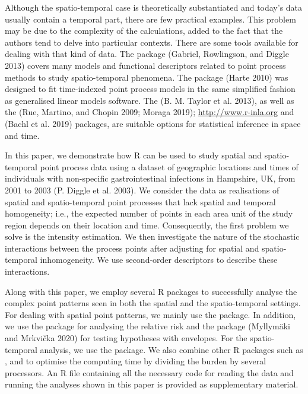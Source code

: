Although the spatio-temporal case is theoretically substantiated and today's data usually contain a temporal part, there are few practical examples. This problem may be due to the complexity of the calculations, added to the fact that the authors tend to delve into particular contexts. There are some tools available for dealing with that kind of data. The  package (Gabriel, Rowlingson, and Diggle 2013) covers many models and functional descriptors related to point process methods to study spatio-temporal phenomena. The  package (Harte 2010) was designed to fit time-indexed point process models in the same simplified fashion as generalised linear models software. The  (B. M. Taylor et al. 2013), as well as the  (Rue, Martino, and Chopin 2009; Moraga 2019); \url{http://www.r-inla.org} and  (Bachl et al. 2019) packages, are suitable options for statistical inference in space and time.

In this paper, we demonstrate how R can be used to study spatial and spatio-temporal point process data using a dataset of geographic locations and times of individuals with non-specific gastrointestinal infections in Hampshire, UK, from 2001 to 2003 (P. Diggle et al. 2003). We consider the data as realisations of spatial and spatio-temporal point processes that lack spatial and temporal homogeneity; i.e., the expected number of points in each area unit of the study region depends on their location and time. Consequently, the first problem we solve is the intensity estimation. We then investigate the nature of the stochastic interactions between the process points after adjusting for spatial and spatio-temporal inhomogeneity. We use second-order descriptors to describe these interactions.

Along with this paper, we employ several R packages to successfully analyse the complex point patterns seen in both the spatial and the spatio-temporal settings. For dealing with spatial point patterns, we mainly use the  package. In addition, we use the  package for analysing the relative risk and the  package (Myllymäki and Mrkvička 2020) for testing hypotheses with envelopes. For the spatio-temporal analysis, we use the  package. We also combine other R packages such as ,  and  to optimise the computing time by dividing the burden by several processors. An R file containing all the necessary code for reading the data and running the analyses shown in this paper is provided as supplementary material.


